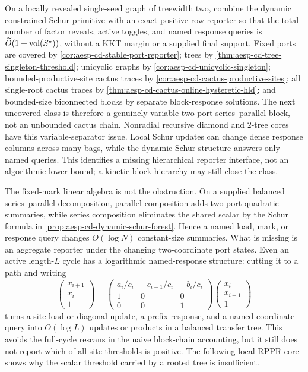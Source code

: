 

\begin{problem}
\label{prob:aesp-cd-variable-two-port-reporter}
On a locally revealed single-seed graph of treewidth two, combine the dynamic
constrained-Schur primitive with an exact positive-row reporter so that the
total number of factor reveals, active toggles, and named response queries is
$\widetilde O(1+\operatorname{vol}(S^\star))$, without a KKT margin or a supplied final
support.  Fixed ports are covered by
\cref{cor:aesp-cd-stable-port-reporter}; trees by
\cref{thm:aesp-cd-tree-singleton-threshold}; unicyclic graphs by
\cref{cor:aesp-cd-unicyclic-singleton}; bounded-productive-site cactus traces
by \cref{cor:aesp-cd-cactus-productive-sites}; all single-root cactus traces
by \cref{thm:aesp-cd-cactus-online-hysteretic-hld}; and bounded-size
biconnected blocks by separate block-response solutions.  The next uncovered
class is therefore a genuinely variable two-port series--parallel block, not
an unbounded cactus chain.  Nonradial recursive diamond and $2$-tree cores
have this variable-separator issue.
Local Schur updates can change dense response columns across many bags, while
the dynamic Schur structure answers only named queries.  This identifies a
missing hierarchical reporter interface, not an algorithmic lower bound; a
kinetic block hierarchy may still close the class.
\end{problem}

The fixed-mark linear algebra is not the obstruction.  On a supplied balanced
series--parallel decomposition, parallel composition adds two-port quadratic
summaries, while series composition eliminates the shared scalar by the Schur
formula in \cref{prop:aesp-cd-dynamic-schur-forest}.  Hence a named load,
mark, or response query changes $O(\log N)$ constant-size summaries.  What is
missing is an aggregate reporter under the changing two-coordinate port
states.  Even an active length-$L$ cycle has a logarithmic named-response
structure: cutting it to a path and writing
\begin{equation*}
 \begin{pmatrix}x_{i+1}\\x_i\\1\end{pmatrix}
 =
 \begin{pmatrix}
  a_i/c_i&-c_{i-1}/c_i&-b_i/c_i\\
  1&0&0\\0&0&1
 \end{pmatrix}
 \begin{pmatrix}x_i\\x_{i-1}\\1\end{pmatrix}
\end{equation*}
turns a site load or diagonal update, a prefix response, and a named
coordinate query into $O(\log L)$ updates or products in a balanced transfer
tree.  This avoids the full-cycle rescans in the naive block-chain accounting,
but it still does not report which of all site thresholds is positive.  The
following local RPPR core shows why the scalar threshold carried by a rooted
tree is insufficient.

